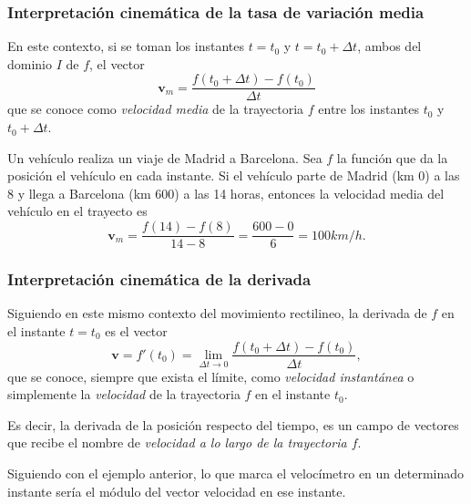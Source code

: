 \begin{frame}
\frametitle{Interpretación cinemática de la tasa de variación media}
En este contexto, si se toman los instantes $t=t_0$ y $t=t_0+\Delta t$, ambos del dominio $I$ de $f$, el vector
\[
\mathbf{v}_m=\frac{f(t_0+\Delta t)-f(t_0)}{\Delta t}
\]
que se conoce como \emph{velocidad media} de la trayectoria $f$ entre los instantes $t_0$ y $t_0+\Delta t$. 

Un vehículo realiza un viaje de Madrid a Barcelona.
Sea $f$ la función que da la posición el vehículo en cada instante.
Si el vehículo parte de Madrid (km 0) a las 8 y llega a Barcelona (km 600) a las 14 horas, entonces la velocidad media
del vehículo en el trayecto es 
\[ 
\mathbf{v}_m=\frac{f(14)-f(8)}{14-8}=\frac{600-0}{6} = 100 km/h. 
\]
\end{frame}


\begin{frame}
\frametitle{Interpretación cinemática de la derivada}
Siguiendo en este mismo contexto del movimiento rectilineo, la derivada de $f$ en el instante $t=t_0$ es el vector
\[
\mathbf{v}=f'(t_0)=\lim_{\Delta t\rightarrow 0}\frac{f(t_0+\Delta t)-f(t_0)}{\Delta t},
\]
que se conoce, siempre que exista el límite, como \emph{velocidad instantánea} o simplemente la \emph{velocidad} de la
trayectoria $f$ en el instante $t_0$.

Es decir, la derivada de la posición respecto del tiempo, es un campo de vectores que recibe el nombre de
\emph{velocidad a lo largo de la trayectoria $f$}.

Siguiendo con el ejemplo anterior, lo que marca el velocímetro en un determinado instante sería el módulo del vector
velocidad  en ese instante.
\end{frame}


